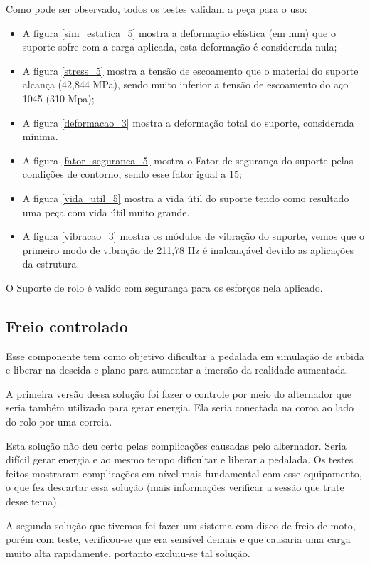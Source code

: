 Como pode ser observado, todos os testes validam a peça para o uso:
\begin{itemize}
    \item A figura \ref{sim_estatica_5} mostra a deformação elástica (em mm) que o suporte sofre com a carga aplicada, esta deformação é considerada nula;
    \item A figura \ref{stress_5} mostra a tensão de escoamento que o material do suporte alcança (42,844 MPa), sendo muito inferior a tensão de escoamento do aço 1045 (310 Mpa);
    \item A figura \ref{deformacao_3} mostra a deformação total do suporte, considerada mínima.
    \item A figura \ref{fator_seguranca_5} mostra o Fator de segurança do suporte pelas condições de contorno, sendo esse fator igual a 15;
    \item A figura \ref{vida_util_5} mostra a vida útil do suporte tendo como resultado uma peça com vida útil muito grande.
    \item A figura \ref{vibracao_3} mostra os módulos de vibração do suporte, vemos que o primeiro modo de vibração de 211,78 Hz é inalcançável devido as aplicações da estrutura.
\end{itemize}

O Suporte de rolo é valido com segurança para os esforços nela aplicado.

\subsection{Freio controlado} 
    Esse componente tem como objetivo dificultar a pedalada em simulação de subida e liberar na descida e plano para aumentar a imersão da realidade aumentada.

    A primeira versão dessa solução foi fazer o controle por meio do alternador que seria também utilizado para gerar energia. Ela seria conectada na coroa ao lado do rolo por uma correia.

    Esta solução não deu certo pelas complicações causadas pelo alternador. Seria difícil gerar energia e ao mesmo tempo dificultar e liberar a pedalada. Os testes feitos mostraram complicações em nível mais fundamental com esse equipamento, o que fez descartar essa solução (mais informações verificar a sessão que trate desse tema).

    A segunda solução que tivemos foi fazer um sistema com disco de freio de moto, porém com teste, verificou-se que era sensível demais e que causaria uma carga muito alta rapidamente, portanto excluiu-se tal solução.

